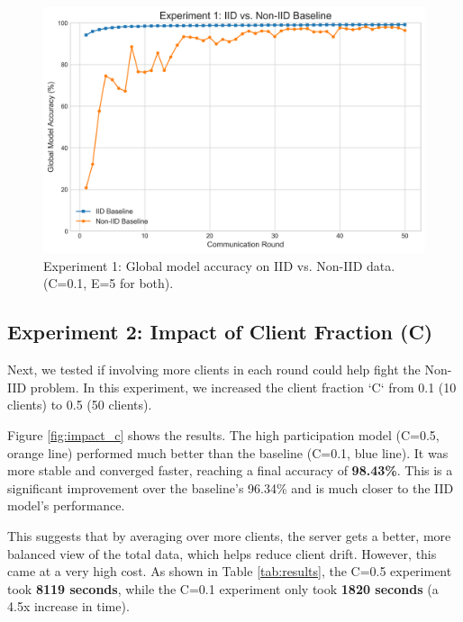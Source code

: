 \documentclass[conference]{IEEEtran}
\begin{document}
\begin{figure}[htbp]
  \centering
  \includegraphics[width=0.9\linewidth]{fig_1_iid_vs_non_iid.png}
  \caption{Experiment 1: Global model accuracy on IID vs. Non-IID data. (C=0.1, E=5 for both).}
  \label{fig:iid}
\end{figure}

\subsection{Experiment 2: Impact of Client Fraction (C)}
Next, we tested if involving more clients in each round could help fight the Non-IID problem. In this experiment, we increased the client fraction `C` from 0.1 (10 clients) to 0.5 (50 clients).

Figure \ref{fig:impact_c} shows the results. The high participation model (C=0.5, orange line) performed much better than the baseline (C=0.1, blue line). It was more stable and converged faster, reaching a final accuracy of \textbf{98.43\%}. This is a significant improvement over the baseline's 96.34\% and is much closer to the IID model's performance.

This suggests that by averaging over more clients, the server gets a better, more balanced view of the total data, which helps reduce client drift. However, this came at a very high cost. As shown in Table \ref{tab:results}, the C=0.5 experiment took \textbf{8119 seconds}, while the C=0.1 experiment only took \textbf{1820 seconds} (a 4.5x increase in time).
\end{document}
